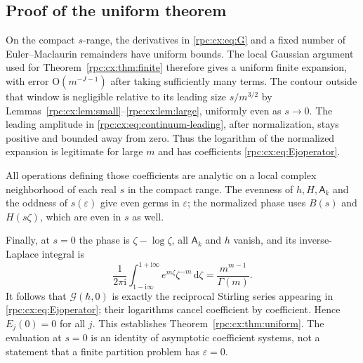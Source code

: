 \documentclass[11pt]{article}
\theoremstyle{definition}
\theoremstyle{remark}
\newcommand{\ii}{\mathrm i}
\newcommand{\dd}{\,\mathrm d}
\numberwithin{equation}{section}
\begin{document}
\subsection{Proof of the uniform theorem}
On the compact $s$-range, the derivatives in \eqref{rpc:cx:eq:G} and a fixed
number of Euler--Maclaurin remainders have uniform bounds. The local
Gaussian argument used for Theorem~\ref{rpc:cx:thm:finite} therefore gives a
uniform finite expansion, with error $\mathrm O(m^{-J-1})$ after taking
sufficiently many terms. The contour outside that window is negligible
relative to its leading size $s/m^{3/2}$ by
Lemmas~\ref{rpc:cx:lem:small}--\ref{rpc:cx:lem:large}, uniformly even as $s\to0$.
The leading amplitude in \eqref{rpc:cx:eq:continuum-leading}, after
normalization, stays positive and bounded away from zero. Thus the
logarithm of the normalized expansion is legitimate for large $m$ and
has coefficients \eqref{rpc:cx:eq:Ejoperator}.

All operations defining those coefficients are analytic on a local
complex neighborhood of each real $s$ in the compact range.
The evenness of $h,H,\mathsf A_k$ and the oddness of $s(\varepsilon)$ give even germs
in $\varepsilon$; the normalized phase uses $B(s)$ and $H(s\zeta)$, which are even
in $s$ as well.

Finally, at $s=0$ the phase is $\zeta-\log \zeta$, all $\mathsf A_k$ and $h$ vanish,
and its inverse-Laplace integral is
\begin{equation}\label{rpc:cx:eq:gamma-integral}
 \frac1{2\pi\ii}\int_{1-\ii\infty}^{1+\ii\infty}
          e^{m\zeta}\zeta^{-m}\dd \zeta=\frac{m^{m-1}}{\Gamma(m)}.
\end{equation}
It follows that $\mathcal G(\hbar,0)$ is exactly the reciprocal Stirling series
appearing in \eqref{rpc:cx:eq:Ejoperator}; their logarithms cancel coefficient
by coefficient. Hence $E_j(0)=0$ for all $j$.
This establishes Theorem~\ref{rpc:cx:thm:uniform}. The evaluation at $s=0$ is
an identity of asymptotic coefficient systems, not a statement that a
finite partition problem has $\varepsilon=0$.
\end{document}
